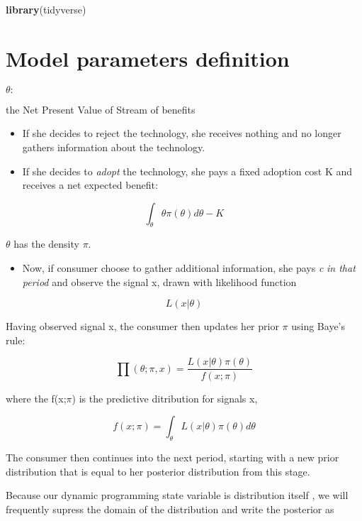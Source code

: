 \documentclass[
]{book}
\newenvironment{Shaded}{\begin{snugshade}}{\end{snugshade}}
\newcommand{\KeywordTok}[1]{\textcolor[rgb]{0.13,0.29,0.53}{\textbf{#1}}}
\newcommand{\NormalTok}[1]{#1}
\providecommand{\tightlist}{%
  \setlength{\itemsep}{0pt}\setlength{\parskip}{0pt}}
\begin{document}
\begin{Shaded}
\begin{Highlighting}[]
\KeywordTok{library}\NormalTok{(tidyverse)}
\end{Highlighting}
\end{Shaded}

\hypertarget{model-parameters-definition}{%
\section{Model parameters definition}\label{model-parameters-definition}}

\(\theta:\)

the Net Present Value of Stream of benefits

\begin{itemize}
\item
  If she decides to reject the technology, she receives nothing and no longer gathers information about the technology.
\item
  If she decides to \emph{adopt} the technology, she pays a fixed adoption cost K and receives a net expected benefit:
\end{itemize}

\[\int_{\theta} \theta \pi(\theta)d\theta - K\]

\(\theta\) has the density \(\pi\).

\begin{itemize}
\tightlist
\item
  Now, if consumer choose to gather additional information, she pays \emph{c} \emph{in that period} and observe the signal x, drawn with likelihood function
\end{itemize}

\[L(x|\theta)\]

Having observed signal x, the consumer then updates her prior \(\pi\) using Baye's rule:

\[\prod(\theta;\pi,x) = \frac{L(x|\theta)\pi(\theta)}{f(x;\pi)} \]

where the f(x;\(\pi\)) is the predictive ditribution for signals x,

\[f(x;\pi) =\int_{\theta} L(x|\theta)\pi(\theta)d\theta\]

The consumer then continues into the next period, starting with a new prior distribution that is equal to her posterior distribution from this stage.

Because our dynamic programming state variable is distribution itself , we will frequently supress the domain of the distribution and write the posterior as
\end{document}
